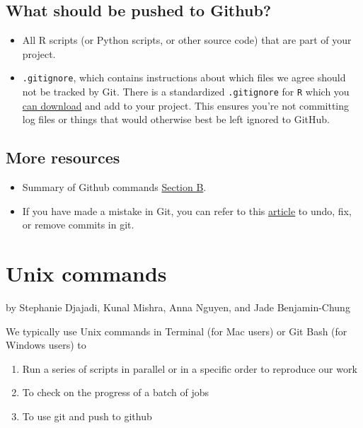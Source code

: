 \documentclass[
]{book}
\providecommand{\tightlist}{%
  \setlength{\itemsep}{0pt}\setlength{\parskip}{0pt}}
\begin{document}
\section{What should be pushed to Github?}\label{what-should-be-pushed-to-github}

\begin{itemize}
\tightlist
\item
  All R scripts (or Python scripts, or other source code) that are part of your project.
\item
  \texttt{.gitignore}, which contains instructions about which files we agree should not be tracked by Git. There is a standardized \texttt{.gitignore} for \texttt{R} which you \href{https://github.com/github/gitignore/blob/master/R.gitignore}{can download} and add to your project. This ensures you're not committing log files or things that would otherwise best be left ignored to GitHub.
\end{itemize}

\section{More resources}\label{more-resources}

\begin{itemize}
\tightlist
\item
  Summary of Github commands \href{https://sp19.datastructur.es/materials/guides/using-git\#b-local-repositories-narrative-introduction}{Section B}.
\item
  If you have made a mistake in Git, you can refer to this \href{https://sethrobertson.github.io/GitFixUm/fixup.html}{article} to undo, fix, or remove commits in git.
\end{itemize}

\chapter{Unix commands}\label{unix}

by Stephanie Djajadi, Kunal Mishra, Anna Nguyen, and Jade Benjamin-Chung

We typically use Unix commands in Terminal (for Mac users) or Git Bash (for Windows users) to

\begin{enumerate}
\def\labelenumi{\arabic{enumi}.}
\tightlist
\item
  Run a series of scripts in parallel or in a specific order to reproduce our work
\item
  To check on the progress of a batch of jobs
\item
  To use git and push to github
\end{enumerate}
\end{document}
